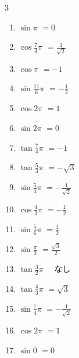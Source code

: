 \begin{multicols}{3}
\begin{enumerate}
  \item $\displaystyle \sin{\pi}$
        $\displaystyle =0$

  \item $\displaystyle \cos{\frac{7}{4}\pi}$
        $\displaystyle =\frac{1}{\sqrt{2}}$

  \item $\displaystyle \cos{\pi}$
        $\displaystyle =-1$

  \item $\displaystyle \sin{\frac{11}{6}\pi}$
        $\displaystyle =-\frac{1}{2}$

  \item $\displaystyle \cos{2\pi}$
        $\displaystyle =1$

  \item $\displaystyle \sin{2\pi}$
        $\displaystyle =0$

  \item $\displaystyle \tan{\frac{7}{4}\pi}$
        $\displaystyle =-1$

  \item $\displaystyle \tan{\frac{5}{3}\pi}$
        $\displaystyle =-\sqrt{3}$

  \item $\displaystyle \sin{\frac{5}{4}\pi}$
        $\displaystyle =-\frac{1}{\sqrt{2}}$

  \item $\displaystyle \cos{\frac{4}{3}\pi}$
        $\displaystyle =-\frac{1}{2}$

\columnbreak %

  \item $\displaystyle \sin{\frac{5}{6}\pi}$
        $\displaystyle =\frac{1}{2}$

  \item $\displaystyle \sin{\frac{\pi}{3}}$
        $\displaystyle =\frac{\sqrt{3}}{2}$

  \item $\displaystyle \tan{\frac{3}{2}\pi}$
        $\displaystyle \quad なし$

  \item $\displaystyle \tan{\frac{4}{3}\pi}$
        $\displaystyle =\sqrt{3}$

  \item $\displaystyle \sin{\frac{7}{4}\pi}$
        $\displaystyle =-\frac{1}{\sqrt{2}}$

  \item $\displaystyle \cos{2\pi}$
        $\displaystyle =1$

  \item $\displaystyle \sin{0}$
        $\displaystyle =0$


\end{enumerate}
\end{multicols}
